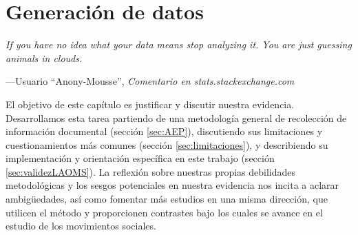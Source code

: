 \documentclass[letterpaper, 11pt]{book}
\theoremstyle{definition}
\theoremstyle{remark}
\begin{document}
\chapter{Generación de datos}
\label{chap:Protestas_y_AEP}

\epigraph{\itshape If you have no idea what your data means stop analyzing it. You are just guessing animals in clouds.}{---Usuario ``Anony-Mousse'', \textit{Comentario en stats.stackexchange.com}}


\begingroup
\small
    El objetivo de este capítulo es justificar y discutir nuestra evidencia. 
    Desarrollamos esta tarea partiendo de una metodología general de recolección de información documental (sección \ref{sec:AEP}), 
    discutiendo sus limitaciones y cuestionamientos más comunes (sección \ref{sec:limitaciones}), 
    y describiendo su implementación y orientación específica en este trabajo (sección \ref{sec:validezLAOMS}). 
    La reflexión sobre nuestras propias debilidades metodológicas y los sesgos potenciales en nuestra evidencia nos incita a aclarar ambigüedades, así como fomentar más estudios en una misma dirección, que utilicen el método y proporcionen contrastes bajo los cuales se avance en el estudio de los movimientos sociales.
\vspace{2em}
\endgroup
\end{document}

